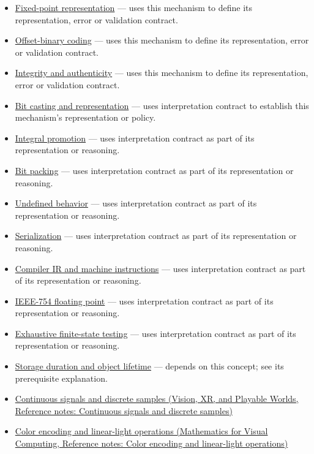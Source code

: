 \hypertarget{appendix-f414bd4ed05c-used-by}{}

\begin{itemize}
\tightlist
\item
  \hyperref[appendix-1d0dbe8924cc]{Fixed-point representation} --- uses this mechanism to define its representation, error or validation contract.
\item
  \hyperref[appendix-53a8cfb25f8d]{Offset-binary coding} --- uses this mechanism to define its representation, error or validation contract.
\item
  \hyperref[appendix-cbe594d1ab0a]{Integrity and authenticity} --- uses this mechanism to define its representation, error or validation contract.
\item
  \hyperref[appendix-34ee45f161c1]{Bit casting and representation} --- uses interpretation contract to establish this mechanism's representation or policy.
\item
  \hyperref[appendix-45303d03796a]{Integral promotion} --- uses interpretation contract as part of its representation or reasoning.
\item
  \hyperref[appendix-1f9963e1a5d1]{Bit packing} --- uses interpretation contract as part of its representation or reasoning.
\item
  \hyperref[appendix-f558f5b4d8f2]{Undefined behavior} --- uses interpretation contract as part of its representation or reasoning.
\item
  \hyperref[appendix-91d09ebed979]{Serialization} --- uses interpretation contract as part of its representation or reasoning.
\item
  \hyperref[appendix-942ad41afb30]{Compiler IR and machine instructions} --- uses interpretation contract as part of its representation or reasoning.
\item
  \hyperref[appendix-343615f49ddf]{IEEE-754 floating point} --- uses interpretation contract as part of its representation or reasoning.
\item
  \hyperref[appendix-05db24ccc28a]{Exhaustive finite-state testing} --- uses interpretation contract as part of its representation or reasoning.
\item
  \hyperref[appendix-0b104bcba06b]{Storage duration and object lifetime} --- depends on this concept; see its prerequisite explanation.
\item
  \href{../07-Vision-XR-and-Playable-Worlds/main.pdf\#nameddest=appendix-1077ea8fc737}{Continuous signals and discrete samples (Vision, XR, and Playable Worlds, Reference notes: Continuous signals and discrete samples)}
\item
  \href{../02-Mathematics-for-Visual-Computing/main.pdf\#nameddest=appendix-a9f83ad40792}{Color encoding and linear-light operations (Mathematics for Visual Computing, Reference notes: Color encoding and linear-light operations)}
\end{itemize}

